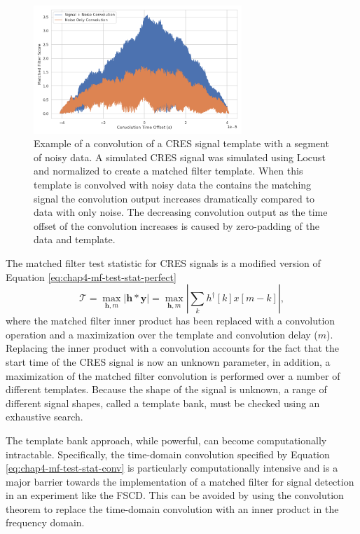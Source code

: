 \begin{figure}[htbp]
    \centering
    \includegraphics*[width=0.7\textwidth]{figs/Chapter-4/220318_example_convolution.png}
    \caption{Example of a convolution of a CRES signal template with a segment of noisy data. A simulated CRES signal was simulated using Locust and normalized to create a matched filter template. When this template is convolved with noisy data the contains the matching signal the convolution output increases dramatically compared to data with only noise. The decreasing convolution output as the time offset of the convolution increases is caused by zero-padding of the data and template. }
\end{figure}

The matched filter test statistic for CRES signals is a modified version of Equation \ref{eq:chap4-mf-test-stat-perfect}
\begin{equation}
    \mathcal{T} = \max_{\bm{h},m}\left|\bm{h}\ast\bm{y}\right|=\max_{\bm{h},m}\left|\sum_{k}h^\dagger[k]x[m-k]\right|,
    \label{eq:chap4-mf-test-stat-conv}
\end{equation}
where the matched filter inner product has been replaced with a convolution operation and a maximization over the template and convolution delay ($m$). Replacing the inner product with a convolution accounts for the fact that the start time of the CRES signal is now an unknown parameter, in addition, a maximization of the matched filter convolution is performed over a number of different templates. Because the shape of the signal is unknown, a range of different signal shapes, called a template bank, must be checked using an exhaustive search.

The template bank approach, while powerful, can become computationally intractable. Specifically, the time-domain convolution specified by Equation \ref{eq:chap4-mf-test-stat-conv} is particularly computationally intensive and is a major barrier towards the implementation of a matched filter for signal detection in an experiment like the FSCD. This can be avoided by using the convolution theorem to replace the time-domain convolution with an inner product in the frequency domain. 


